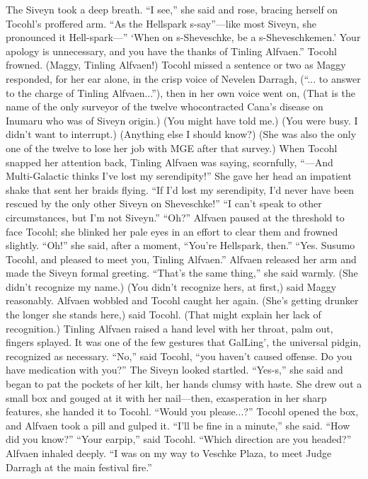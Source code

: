 \documentclass[9pt]{article}
\begin{document}
The Siveyn took a deep breath. “I see,” she said and rose, bracing herself on Tocohl’s proffered
arm. “As the Hellspark s-say”—like most Siveyn, she pronounced it Hell-spark—” ‘When on
s-Sheveschke, be a s-Sheveschkemen.’ Your apology is unnecessary, and you have the thanks of Tinling
Alfvaen.”
Tocohl frowned. (Maggy, Tinling Alfvaen!) Tocohl missed a sentence or two as Maggy responded,
for her ear alone, in the crisp voice of Nevelen Darragh, (“... to answer to the charge of Tinling
Alfvaen...”), then in her own voice went on, (That is the name of the only surveyor of the twelve whocontracted Cana’s disease on Inumaru who was of Siveyn origin.)
(You might have told me.)
(You were busy. I didn’t want to interrupt.)
(Anything else I should know?)
(She was also the only one of the twelve to lose her job with MGE after that survey.)
When Tocohl snapped her attention back, Tinling Alfvaen was saying, scornfully, “—And
Multi-Galactic thinks I’ve lost my serendipity!” She gave her head an impatient shake that sent her braids
flying. “If I’d lost my serendipity, I’d never have been rescued by the only other Siveyn on Sheveschke!”
“I can’t speak to other circumstances, but I’m not Siveyn.”
“Oh?” Alfvaen paused at the threshold to face Tocohl; she blinked her pale eyes in an effort to clear
them and frowned slightly. “Oh!” she said, after a moment, “You’re Hellspark, then.”
“Yes. Susumo Tocohl, and pleased to meet you, Tinling Alfvaen.”
Alfvaen released her arm and made the Siveyn formal greeting. “That’s the same thing,” she said
warmly.
(She didn’t recognize my name.)
(You didn’t recognize hers, at first,) said Maggy reasonably.
Alfvaen wobbled and Tocohl caught her again. (She’s getting drunker the longer she stands here,)
said Tocohl. (That might explain her lack of recognition.)
Tinling Alfvaen raised a hand level with her throat, palm out, fingers splayed. It was one of the few
gestures that GalLing’, the universal pidgin, recognized as necessary.
“No,” said Tocohl, “you haven’t caused offense. Do you have medication with you?”
The Siveyn looked startled. “Yes-s,” she said and began to pat the pockets of her kilt, her hands
clumsy with haste.
She drew out a small box and gouged at it with her nail—then, exasperation in her sharp features, she
handed it to Tocohl. “Would you please...?”
Tocohl opened the box, and Alfvaen took a pill and gulped it. “I’ll be fine in a minute,” she said.
“How did you know?”
“Your earpip,” said Tocohl. “Which direction are you headed?”
Alfvaen inhaled deeply. “I was on my way to Veschke Plaza, to meet Judge Darragh at the main
festival fire.”
\end{document}
